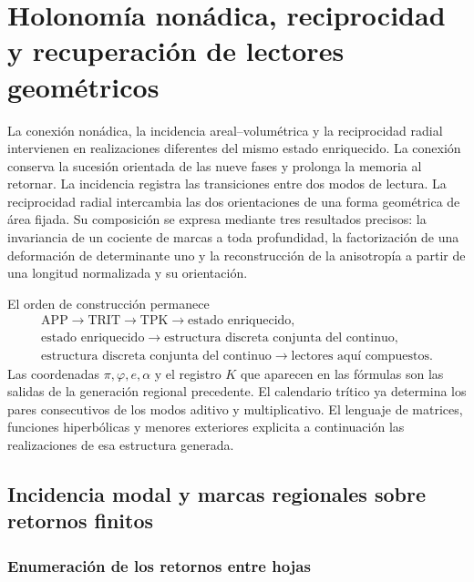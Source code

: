 \chapter{Holonomía nonádica, reciprocidad y recuperación de lectores geométricos}
\label{hrr:capitulo}

La conexión nonádica, la incidencia areal--volumétrica y la reciprocidad
radial intervienen en realizaciones diferentes del mismo estado enriquecido.
La conexión conserva la sucesión orientada de las nueve fases y prolonga
la memoria al retornar. La incidencia registra las transiciones entre dos
modos de lectura. La reciprocidad radial intercambia las dos orientaciones
de una forma geométrica de área fijada. Su composición se expresa mediante
tres resultados precisos: la invariancia de un cociente de marcas a toda
profundidad, la factorización de una deformación de determinante uno y la
reconstrucción de la anisotropía a partir de una longitud normalizada y su
orientación.

El orden de construcción permanece
\[
 \begin{gathered}
 \mathrm{APP}\longrightarrow\mathrm{TRIT}\longrightarrow\mathrm{TPK}
 \longrightarrow\text{estado enriquecido},\\
 \text{estado enriquecido}
 \longrightarrow\text{estructura discreta conjunta del continuo},\\
 \text{estructura discreta conjunta del continuo}
 \longrightarrow\text{lectores aquí compuestos}.
 \end{gathered}
\]
Las coordenadas \(\pi,\varphi,e,\alpha\) y el registro \(K\) que aparecen
en las fórmulas son las salidas de la generación regional precedente. El
calendario trítico ya determina los pares consecutivos de los modos
aditivo y multiplicativo. El lenguaje de matrices, funciones hiperbólicas
y menores exteriores explicita a continuación las realizaciones de esa
estructura generada.

\section{Incidencia modal y marcas regionales sobre retornos finitos}
\label{hrr:incidencia}

\subsection{Enumeración de los retornos entre hojas}

